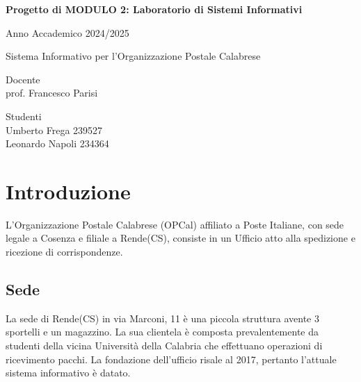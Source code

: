 

\author{Umberto Frega, Leonardo Napoli}
\setlength{\headheight}{15pt}
\setlength{\footskip}{47.5pt}
\addtolength{\topmargin}{-0.49998pt}

\fancyhf{}
\fancyfoot[L]{\thepage}
\fancyhead[R]{\theauthor}

\pagestyle{fancy}

\begin{titlepage}
  \centering
  {\Large \bfseries Progetto di MODULO 2: Laboratorio di Sistemi Informativi\par}
  {\Large Anno Accademico 2024/2025 \par}
  \vspace{1cm} %
  \vfill
  {\huge Sistema Informativo per l'Organizzazione Postale Calabrese\par}
  \vfill
  \noindent
  \begin{minipage}[t]{0.5\textwidth}
    \raggedright
    Docente \\  prof. Francesco Parisi
  \end{minipage}%
  \hfill
  \begin{minipage}[t]{0.4\textwidth}
    \raggedleft
    Studenti \\ Umberto Frega 239527 \\ Leonardo Napoli 234364
  \end{minipage}

\end{titlepage}
\tableofcontents
\newpage
\section{Introduzione}
L'Organizzazione Postale Calabrese (OPCal) affiliato a Poste Italiane, con sede legale a Cosenza e filiale a Rende(CS), 
consiste in un Ufficio atto alla spedizione e ricezione di corrispondenze.
\subsection{Sede}
La sede di Rende(CS) in via Marconi, 11 è una piccola struttura avente 3 sportelli e un magazzino. La sua clientela è composta 
prevalentemente da studenti della vicina Università della Calabria che effettuano operazioni di ricevimento pacchi.
La fondazione dell'ufficio risale al 2017, pertanto l'attuale sistema informativo è datato.
